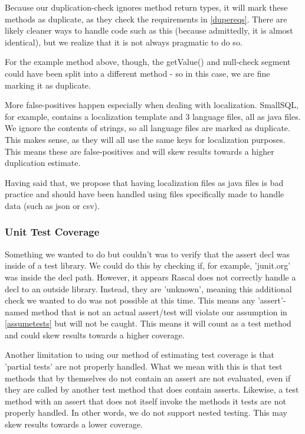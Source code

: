 \documentclass{article}
\begin{document}
Because our duplication-check ignores method return types, it will mark these methods as duplicate, as they check the requirements in \ref{dupereqs}. 
There are likely cleaner ways to handle code such as this (because admittedly, it is almost identical), but we realize that it is not always pragmatic to do so. 

For the example method above, though, the getValue() and null-check segment could have been split into a different method - so in this case, we are fine marking it as duplicate.

More false-positives happen especially when dealing with localization. SmallSQL, for example, contains a localization template and 3 language files, all as java files. We ignore the contents of strings, so all language files are marked as duplicate. This makes sense, as they will all use the same keys for localization purposes. This means these are false-positives and will skew results towards a higher duplication estimate.

Having said that, we propose that having localization files as java files is bad practice and should have been handled using files specifically made to handle data (such as json or csv).

\subsubsection{Unit Test Coverage}
Something we wanted to do but couldn't was to verify that the assert decl was inside of a test library. We could do this by checking if, for example, 'junit.org' was inside the decl path. However, it appears Rascal does not correctly handle a decl to an outside library. Instead, they are 'unknown', meaning this additional check we wanted to do was not possible at this time. This means any 'assert'-named method that is not an actual assert/test will violate our assumption in \ref{assumetests} but will not be caught. This means it will count as a test method and could skew results towards a higher coverage.

Another limitation to using our method of estimating test coverage is that 'partial tests' are not properly handled. What we mean with this is that test methods that by themselves do not contain an assert are not evaluated, even if they are called by another test method that does contain asserts. Likewise, a test method with an assert that does not itself invoke the methods it tests are not properly handled.
In other words, we do not support nested testing. This may skew results towards a lower coverage.
\end{document}
